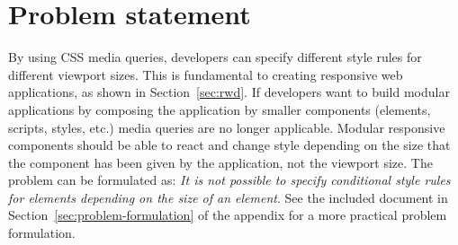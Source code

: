 \documentclass[a4paper,11pt]{kth-mag}
\newcommand{\problemformulation}{\emph{It is not possible to specify conditional style rules for \glspl{element} depending on the size of an element}}
\begin{document}
    \section{Problem statement}\label{sec:problem}
      By using \gls{CSS} \gls{media queries}, developers can specify different style rules for different \gls{viewport} sizes.
      This is fundamental to creating \gls{responsive} \gls{web} applications, as shown in Section~\ref{sec:rwd}.
      If developers want to build modular applications by composing the application by smaller components (\glspl{element}, scripts, styles, etc.) \gls{media queries} are no longer applicable.
      Modular \gls{responsive} components should be able to react and change style depending on the size that the component has been given by the application, not the \gls{viewport} size. 
      The problem can be formulated as: \problemformulation.
      See the included document in Section~\ref{sec:problem-formulation} of the appendix for a more practical problem formulation.
\end{document}
